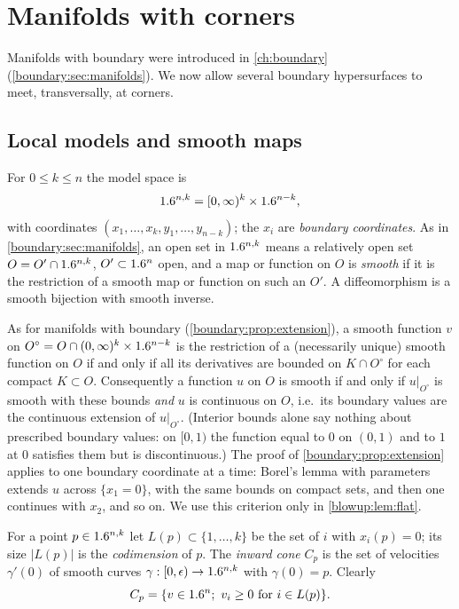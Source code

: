 \section{Manifolds with corners}\label{blowup:sec:corners}

Manifolds with boundary were introduced in \cref{ch:boundary}
(\cref{boundary:sec:manifolds}). We now allow several boundary hypersurfaces to meet,
transversally, at corners.

\subsection{Local models and smooth maps}
For $0\le k\le n$ the model space is
\begin{equation*}
  1.6^{n,k}=[0,\infty)^k\times1.6^{n-k},
\end{equation*}
with coordinates $(x_1,\dots,x_k,y_1,\dots,y_{n-k})$; the $x_i$ are \emph{boundary
coordinates}. As in \cref{boundary:sec:manifolds}, an open set in $1.6^{n,k}$ means a
relatively open set $O=O'\cap1.6^{n,k}$, $O'\subset1.6^n$ open, and a map or function on
$O$ is \emph{smooth} if it is the restriction of a smooth map or function on such an
$O'$. A diffeomorphism is a smooth bijection with smooth inverse.

\begin{remark}\label{blowup:rem:smooth}
As for manifolds with boundary (\cref{boundary:prop:extension}), a smooth function $v$
on $O^\circ=O\cap(0,\infty)^k\times1.6^{n-k}$ is the restriction of a (necessarily
unique) smooth function on $O$ if and only if all its derivatives are bounded on
$K\cap O^\circ$ for each compact $K\subset O$. Consequently a function $u$ on $O$ is
smooth if and only if $u|_{O^\circ}$ is smooth with these bounds \emph{and} $u$ is
continuous on $O$, i.e.\ its boundary values are the continuous extension of
$u|_{O^\circ}$. (Interior bounds alone say nothing about prescribed boundary values:
on $[0,1)$ the function equal to $0$ on $(0,1)$ and to $1$ at $0$ satisfies them but
is discontinuous.) The
proof of \cref{boundary:prop:extension} applies to one boundary coordinate at a time:
Borel's lemma with parameters extends $u$ across $\{x_1=0\}$, with the same bounds on
compact sets, and then one continues with $x_2$, and so on. We use this criterion only
in \cref{blowup:lem:flat}.
\end{remark}

For a point $p\in1.6^{n,k}$ let $L(p)\subset\{1,\dots,k\}$ be the set of $i$ with
$x_i(p)=0$; its size $|L(p)|$ is the \emph{codimension} of $p$. The \emph{inward cone}
$C_p$ is the set of velocities $\gamma'(0)$ of smooth curves
$\gamma:[0,\epsilon)\to1.6^{n,k}$ with $\gamma(0)=p$. Clearly
\begin{equation*}
  C_p=\{v\in\R^n;\ v_i\ge0\ \text{for}\ i\in L(p)\}.
\end{equation*}

